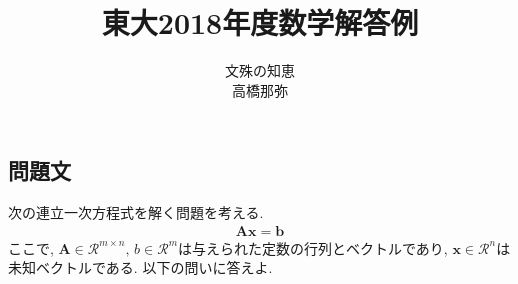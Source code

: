 \documentclass[dvipdfmx,titlepage, 11pt, a4paper]{jsarticle}%
\title{\Huge 東大2018年度数学解答例\\[10mm]}
\author{{\LARGE 文殊の知恵}\\[1mm]\LARGE 高橋那弥}
\date{}
\begin{document}
\newcommand{\dix}{\,{\rm d}}
\maketitle
\tableofcontents %
\newpage
\setcounter{tocdepth}{3}%
\section{}%
\subsection{問題文}
次の連立一次方程式を解く問題を考える.
\begin{eqnarray*}
	\bm{A}\bm{x} = \bm{b}
\end{eqnarray*}
ここで, $\bm{A}\in \mathcal{R}^{m\times n},\,b\in \mathcal{R}^{m}$は与えられた定数の行列とベクトルであり, $\bm{x}\in \mathcal{R}^{n}$は未知ベクトルである. 以下の問いに答えよ.
\end{document}
